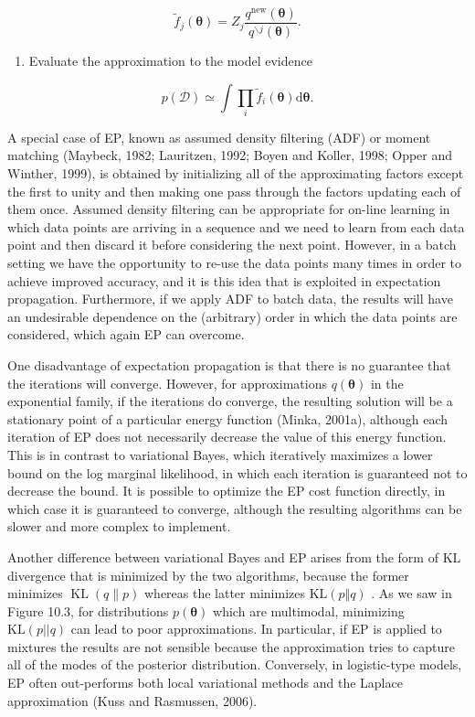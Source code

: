 \documentclass[
  10
]{article}
\providecommand{\tightlist}{%
  \setlength{\itemsep}{0pt}\setlength{\parskip}{0pt}}
\begin{document}
\[
\widetilde {f} _ {j} (\boldsymbol {\theta}) = Z _ {j} \frac {q ^ {\mathrm{new}} (\boldsymbol {\theta})}{q ^ {\backslash j} (\boldsymbol {\theta})}.\tag{10.207}
\]

\begin{enumerate}
\def\labelenumi{\arabic{enumi}.}
\setcounter{enumi}{3}
\tightlist
\item
  Evaluate the approximation to the model evidence
\end{enumerate}

\[
p (\mathcal {D}) \simeq \int \prod_ {i} \widetilde {f} _ {i} (\boldsymbol {\theta}) \mathrm{d} \boldsymbol {\theta}.\tag{10.208}
\]

A special case of EP, known as assumed density filtering (ADF) or moment
matching (Maybeck, 1982; Lauritzen, 1992; Boyen and Koller, 1998; Opper
and Winther, 1999), is obtained by initializing all of the approximating
factors except the first to unity and then making one pass through the
factors updating each of them once. Assumed density filtering can be
appropriate for on-line learning in which data points are arriving in a
sequence and we need to learn from each data point and then discard it
before considering the next point. However, in a batch setting we have
the opportunity to re-use the data points many times in order to achieve
improved accuracy, and it is this idea that is exploited in expectation
propagation. Furthermore, if we apply ADF to batch data, the results
will have an undesirable dependence on the (arbitrary) order in which
the data points are considered, which again EP can overcome.

One disadvantage of expectation propagation is that there is no
guarantee that the iterations will converge. However, for approximations
\(q ( \pmb \theta )\) in the exponential family, if the iterations do
converge, the resulting solution will be a stationary point of a
particular energy function (Minka, 2001a), although each iteration of EP
does not necessarily decrease the value of this energy function. This is
in contrast to variational Bayes, which iteratively maximizes a lower
bound on the log marginal likelihood, in which each iteration is
guaranteed not to decrease the bound. It is possible to optimize the EP
cost function directly, in which case it is guaranteed to converge,
although the resulting algorithms can be slower and more complex to
implement.

Another difference between variational Bayes and EP arises from the form
of KL divergence that is minimized by the two algorithms, because the
former minimizes \(\operatorname { K L } ( q \| p )\) whereas the latter
minimizes \(\mathrm { K L } ( p \Vert q )\) . As we saw in Figure 10.3,
for distributions \(p ( \pmb \theta )\) which are multimodal, minimizing
\(\mathrm { K L } ( p | | q )\) can lead to poor approximations. In
particular, if EP is applied to mixtures the results are not sensible
because the approximation tries to capture all of the modes of the
posterior distribution. Conversely, in logistic-type models, EP often
out-performs both local variational methods and the Laplace
approximation (Kuss and Rasmussen, 2006).
\end{document}
